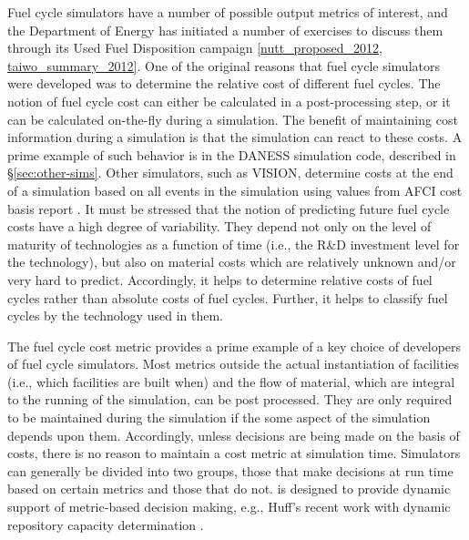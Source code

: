 Fuel cycle simulators have a number of possible output metrics of interest, and
the Department of Energy has initiated a number of exercises to discuss them
through its Used Fuel Disposition campaign \ref{nutt_proposed_2012,
taiwo_summary_2012}. One of the original reasons that fuel cycle simulators were
developed was to determine the relative cost of different fuel cycles. The
notion of fuel cycle cost can either be calculated in a post-processing step, or
it can be calculated on-the-fly during a simulation. The benefit of maintaining
cost information during a simulation is that the simulation can react to these
costs. A prime example of such behavior is in the DANESS simulation code,
described in \S\ref{sec:other-sims}. Other simulators, such as VISION, determine
costs at the end of a simulation based on all events in the simulation using
values from AFCI cost basis report
\cite{yacout_vision_2006,shropshire_advanced_2007}. It must be stressed that the
notion of predicting future fuel cycle costs have a high degree of
variability. They depend not only on the level of maturity of technologies as a
function of time (i.e., the R\&D investment level for the technology), but also
on material costs which are relatively unknown and/or very hard to
predict. Accordingly, it helps to determine relative costs of fuel cycles rather
than absolute costs of fuel cycles. Further, it helps to classify fuel cycles by
the technology used in them.

The fuel cycle cost metric provides a prime example of a key choice of
developers of fuel cycle simulators. Most metrics outside the actual
instantiation of facilities (i.e., which facilities are built when) and the flow
of material, which are integral to the running of the simulation, can be post
processed. They are only required to be maintained during the simulation if the
some aspect of the simulation depends upon them. Accordingly, unless decisions
are being made on the basis of costs, there is no reason to maintain a cost
metric at simulation time. Simulators can generally be divided into two groups,
those that make decisions at run time based on certain metrics and those that do
not. \Cyclus is designed to provide dynamic support of metric-based decision
making, e.g., Huff's recent work with dynamic repository capacity determination
\cite{huff_integrated_2013}.

